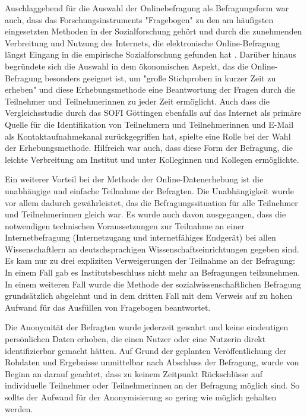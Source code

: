 Auschlaggebend für die Auswahl der Onlinebefragung als Befragungsform war auch, dass das Forschungsinstruments "Fragebogen" zu den am häufigsten eingesetzten Methoden in der Sozialforschung gehört \cite{raab_2012_fragebogen} und durch die zunehmenden Verbreitung und Nutzung des Internets, die elektronische Online-Befragung längst Eingang in die empirische Sozialforschung gefunden hat \cite{Pannewitz_2002}. Darüber hinaus begründete sich die Auswahl in dem ökonomischen Aspekt, das die Online-Befragung besonders geeignet ist, um "große Stichproben in kurzer Zeit zu erheben" \cite{eichhorn_2004_online} und diese Erhebungsmethode eine Beantwortung der Fragen durch die Teilnehmer und Teilnehmerinnen zu jeder Zeit ermöglicht. Auch dass die Vergleichsstudie durch das SOFI Göttingen ebenfalls auf das Internet als primäre Quelle für die Identifikation von Teilnehmern und Teilnehmerinnen und E-Mail als Kontaktaufnahmekanal zurückgegriffen hat, spielte eine Rolle bei der Wahl der Erhebungsmethode. Hilfreich war auch, dass diese Form der Befragung, die leichte Verbreitung am Institut und unter Kolleginnen und Kollegen ermöglichte.

Ein weiterer Vorteil bei der Methode der Online-Datenerhebung ist die unabhängige und einfache Teilnahme der Befragten. Die Unabhängigkeit wurde vor allem dadurch gewährleistet, das die Befragungssituation für alle Teilnehmer und Teilnehmerinnen gleich war. Es wurde auch davon ausgegangen, dass die notwendigen technischen Voraussetzungen zur Teilnahme an einer Internetbefragung (Internetzugang und internetfähiges Endgerät) bei allen Wissenschaftlern an deutschsprachigen Wissenschaftseinrichtungen gegeben sind. Es kam nur zu drei expliziten Verweigerungen der Teilnahme an der Befragung: In einem Fall gab es Institutsbeschluss nicht mehr an Befragungen teilzunehmen. In einem weiteren Fall wurde die Methode der sozialwissenschaftlichen Befragung grundsätzlich abgelehnt und in dem dritten Fall mit dem Verweis auf zu hohen Aufwand für das Ausfüllen von Fragebogen beantwortet.

Die Anonymität der Befragten wurde jederzeit gewahrt und keine eindeutigen persönlichen Daten erhoben, die einen Nutzer oder eine Nutzerin direkt identifizierbar gemacht hätten. Auf Grund der geplanten Veröffentlichung der Rohdaten und Ergebnisse unmittelbar nach Abschluss der Befragung, wurde von Beginn an darauf geachtet, dass zu keinem Zeitpunkt Rückschlüsse auf individuelle Teilnehmer oder Teilnehmerinnen an der Befragung möglich sind. So sollte der Aufwand für der Anonymisierung so gering wie möglich gehalten werden.

